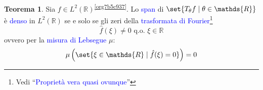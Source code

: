 \documentclass[10pt]{book}
\newcommand{\1}{\mathds{1}}
\newcommand{\R}{\mathds{R}}
\theoremstyle{definition}%
\newtheorem{thm}{Teorema}[section]
\theoremstyle{plain}
\theoremstyle{remark}
\renewcommand{\href}[2]{\textcolor{blue}{#2}}
\begin{document}
\begin{thm}
Sia \(f \in L^{2}(\R)\)\textsuperscript{\ref{org7b5c937}}. Lo \href{../../../../../org/roam/20250630122400-span.org}{span} di \(\set{T_{\theta}f\mid \theta \in \R}\) è \href{../../../../../org/roam/20250301193045-sottoinsieme_denso.org}{denso} in \(L^{2}(\R)\) se e solo se gli zeri della \href{../../../../../org/roam/20250630121906-trasformata_di_fourier.org}{trasformata di Fourier}\footnote{Vedi ``\href{../../../../../org/roam/20250630122745-proprieta_vera_quasi_ovunque.org}{Proprietà vera quasi ovunque}''}
\begin{equation*}
\hat{f}(\xi) \neq 0\text{ q.o. }\xi \in \R
\end{equation*}
ovvero per la \href{../../../../../org/roam/20250630122824-misura_di_lebesgue.org}{misura di Lebsegue} \(\mu\):
\begin{equation*}
\mu\left(\set{\xi \in \R\mid \hat{f}(\xi) = 0}\right) = 0
\end{equation*}
\label{teo:wt2}
\end{thm}
\end{document}
